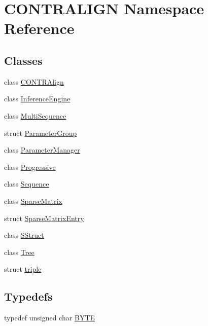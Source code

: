 \hypertarget{namespace_c_o_n_t_r_a_l_i_g_n}{\section{C\+O\+N\+T\+R\+A\+L\+I\+G\+N Namespace Reference}
\label{namespace_c_o_n_t_r_a_l_i_g_n}
}
\subsection*{Classes}
\begin{DoxyCompactItemize}
\item 
class \hyperlink{class_c_o_n_t_r_a_l_i_g_n_1_1_c_o_n_t_r_align}{C\+O\+N\+T\+R\+Align}
\item 
class \hyperlink{class_c_o_n_t_r_a_l_i_g_n_1_1_inference_engine}{Inference\+Engine}
\item 
class \hyperlink{class_c_o_n_t_r_a_l_i_g_n_1_1_multi_sequence}{Multi\+Sequence}
\item 
struct \hyperlink{struct_c_o_n_t_r_a_l_i_g_n_1_1_parameter_group}{Parameter\+Group}
\item 
class \hyperlink{class_c_o_n_t_r_a_l_i_g_n_1_1_parameter_manager}{Parameter\+Manager}
\item 
class \hyperlink{class_c_o_n_t_r_a_l_i_g_n_1_1_progressive}{Progressive}
\item 
class \hyperlink{class_c_o_n_t_r_a_l_i_g_n_1_1_sequence}{Sequence}
\item 
class \hyperlink{class_c_o_n_t_r_a_l_i_g_n_1_1_sparse_matrix}{Sparse\+Matrix}
\item 
struct \hyperlink{struct_c_o_n_t_r_a_l_i_g_n_1_1_sparse_matrix_entry}{Sparse\+Matrix\+Entry}
\item 
class \hyperlink{class_c_o_n_t_r_a_l_i_g_n_1_1_s_struct}{S\+Struct}
\item 
class \hyperlink{class_c_o_n_t_r_a_l_i_g_n_1_1_tree}{Tree}
\item 
struct \hyperlink{struct_c_o_n_t_r_a_l_i_g_n_1_1triple}{triple}
\end{DoxyCompactItemize}
\subsection*{Typedefs}
\begin{DoxyCompactItemize}
\item 
typedef unsigned char \hyperlink{namespace_c_o_n_t_r_a_l_i_g_n_a493b7d65e8378d6b823fd6332f1caa79}{B\+Y\+T\+E}
\end{DoxyCompactItemize}
